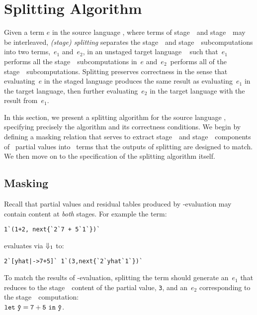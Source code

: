 \section{Splitting Algorithm}
\label{sec:splitting}




Given a term $e$ in the source language \lang, where terms of
stage~\bbone\ and stage~\bbtwo\ may be interleaved, \emph{(stage)
  splitting} separates the stage~\bbone\ and stage~\bbtwo\
subcomputations into two terms,~$e_1$ and~$e_2$, in an unstaged target language \langmono\ 
such that~$e_1$ performs all the
stage~\bbone\ subcomputations in~$e$ and~$e_2$~performs all of the
stage~\bbtwo\ subcomputations. Splitting preserves correctness in the sense that evaluating~$e$ in
the staged language produces the same result as evaluating~$e_1$ in the target language,
then further evaluating~$e_2$ in the target language with the result from~$e_1$.

In this section, we present a
splitting algorithm for the source language \lang, specifying
precisely the algorithm and its correctness conditions.  
We begin by defining a masking relation that serves to extract stage~\bbone\ and
stage~\bbtwo\ components of \lang\ partial values into \langmono\ terms that the outputs of splitting are designed to match. We then 
move on to the specification of the splitting algorithm itself.


\subsection{Masking}

Recall that partial values and residual tables produced by \bbone-evaluation may
contain content at \emph{both} stages. For example the term:
\begin{lstlisting}
1`(1+2, next{`2`7 + 5`1`})`
\end{lstlisting}
evaluates via ${\Downarrow_{ 1}}$ to:
\begin{lstlisting}
2`[yhat|->7+5]` 1`(3,next{`2`yhat`1`})`
\end{lstlisting}
To match the results of \bbone-evaluation,
splitting the term should generate an~$e_1$ that reduces to the stage~\bbone\ content of the partial value, \texttt{3},
and an~$e_2$ corresponding to the stage~\bbtwo\ computation: \\
${\tt let}~{\mathtt{\hat y}} = {\mathtt{7+5}}~{\tt in}~{\mathtt{\hat y}}$.

